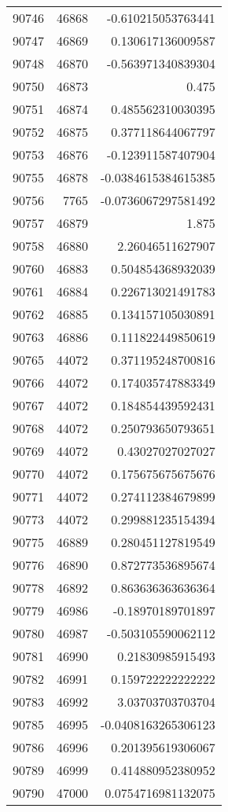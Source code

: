 \begin{tabular}{r | r | r}
90746 & 46868 & -0.610215053763441 \\
90747 & 46869 & 0.130617136009587 \\
90748 & 46870 & -0.563971340839304 \\
90750 & 46873 & 0.475 \\
90751 & 46874 & 0.485562310030395 \\
90752 & 46875 & 0.377118644067797 \\
90753 & 46876 & -0.123911587407904 \\
90755 & 46878 & -0.0384615384615385 \\
90756 & 7765 & -0.0736067297581492 \\
90757 & 46879 & 1.875 \\
90758 & 46880 & 2.26046511627907 \\
90760 & 46883 & 0.504854368932039 \\
90761 & 46884 & 0.226713021491783 \\
90762 & 46885 & 0.134157105030891 \\
90763 & 46886 & 0.111822449850619 \\
90765 & 44072 & 0.371195248700816 \\
90766 & 44072 & 0.174035747883349 \\
90767 & 44072 & 0.184854439592431 \\
90768 & 44072 & 0.250793650793651 \\
90769 & 44072 & 0.43027027027027 \\
90770 & 44072 & 0.175675675675676 \\
90771 & 44072 & 0.274112384679899 \\
90773 & 44072 & 0.299881235154394 \\
90775 & 46889 & 0.280451127819549 \\
90776 & 46890 & 0.872773536895674 \\
90778 & 46892 & 0.863636363636364 \\
90779 & 46986 & -0.18970189701897 \\
90780 & 46987 & -0.503105590062112 \\
90781 & 46990 & 0.21830985915493 \\
90782 & 46991 & 0.159722222222222 \\
90783 & 46992 & 3.03703703703704 \\
90785 & 46995 & -0.0408163265306123 \\
90786 & 46996 & 0.201395619306067 \\
90789 & 46999 & 0.414880952380952 \\
90790 & 47000 & 0.0754716981132075 \\

\end{tabular}
